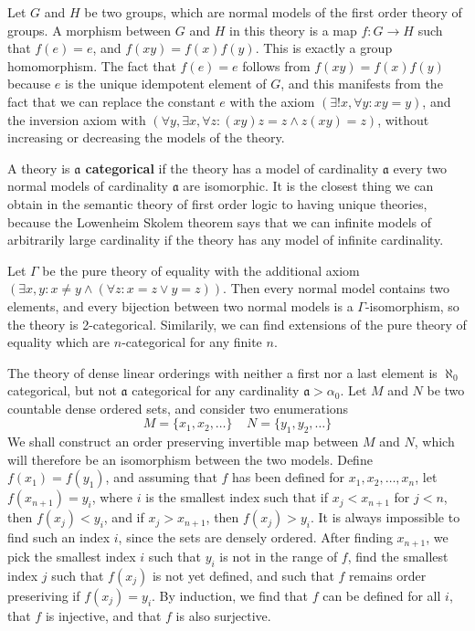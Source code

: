 \begin{example}
    Let $G$ and $H$ be two groups, which are normal models of the first order theory of groups. A morphism between $G$ and $H$ in this theory is a map $f: G \to H$ such that $f(e) = e$, and $f(xy) = f(x) f(y)$. This is exactly a group homomorphism. The fact that $f(e) = e$ follows from $f(xy) = f(x) f(y)$ because $e$ is the unique idempotent element of $G$, and this manifests from the fact that we can replace the constant $e$ with the axiom $(\exists ! x, \forall y: xy = y)$, and the inversion axiom with $(\forall y, \exists x, \forall z: (xy)z = z \wedge z(xy) = z)$, without increasing or decreasing the models of the theory.
\end{example}

A theory is {\bf $\mathfrak{a}$ categorical} if the theory has a model of cardinality $\mathfrak{a}$ every two normal models of cardinality $\mathfrak{a}$ are isomorphic. It is the closest thing we can obtain in the semantic theory of first order logic to having unique theories, because the Lowenheim Skolem theorem says that we can infinite models of arbitrarily large cardinality if the theory has any model of infinite cardinality.

\begin{example}
    Let $\Gamma$ be the pure theory of equality with the additional axiom $(\exists x,y: x \neq y \wedge (\forall z: x = z \vee y = z))$. Then every normal model contains two elements, and every bijection between two normal models is a $\Gamma$-isomorphism, so the theory is 2-categorical. Similarily, we can find extensions of the pure theory of equality which are $n$-categorical for any finite $n$.
\end{example}

\begin{example}
    The theory of dense linear orderings with neither a first nor a last element is $\aleph_0$ categorical, but not $\mathfrak{a}$ categorical for any cardinality $\mathfrak{a} > \alpha_0$. Let $M$ and $N$ be two countable dense ordered sets, and consider two enumerations
    \[ M = \{ x_1, x_2, \dots \}\ \ \ \ \ N = \{ y_1, y_2, \dots \} \]
    We shall construct an order preserving invertible map between $M$ and $N$, which will therefore be an isomorphism between the two models. Define $f(x_1) = f(y_1)$, and assuming that $f$ has been defined for $x_1, x_2, \dots, x_n$, let $f(x_{n+1}) = y_i$, where $i$ is the smallest index such that if $x_j < x_{n+1}$ for $j < n$, then $f(x_j) < y_i$, and if $x_j > x_{n+1}$, then $f(x_j) > y_i$. It is always impossible to find such an index $i$, since the sets are densely ordered. After finding $x_{n+1}$, we pick the smallest index $i$ such that $y_i$ is not in the range of $f$, find the smallest index $j$ such that $f(x_j)$ is not yet defined, and such that $f$ remains order preseriving if $f(x_j) = y_i$. By induction, we find that $f$ can be defined for all $i$, that $f$ is injective, and that $f$ is also surjective.
\end{example}

